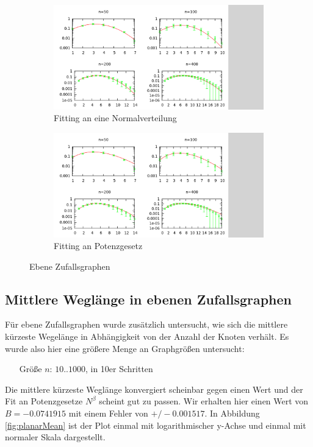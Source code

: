 \documentclass[10pt]{article}
\begin{document}
\begin{figure}[htb!]
\begin{subfigure}{.5\textwidth}
  \centering
  \includegraphics[width=1\linewidth]{../Results/wErrorbars_Normal_Planar.png}
  \caption{Fitting an eine Normalverteilung}
\end{subfigure}%
\begin{subfigure}{.5\textwidth}
  \centering
  \includegraphics[width=1\linewidth]{../Results/wErrorbars_Power_Planar.png}
  \caption{Fitting an Potenzgesetz}
\end{subfigure}
\caption{Ebene Zufallsgraphen}
\label{fig:planar}
\end{figure}

\subsection{Mittlere Weglänge in ebenen Zufallsgraphen}
Für ebene Zufallsgraphen wurde zusätzlich untersucht, wie sich die mittlere kürzeste Wegelänge in Abhängigkeit von der Anzahl der Knoten verhält. Es wurde also hier eine größere Menge an Graphgrößen untersucht:
\begin{itemize}
\item[\quad Größe $n$:] $10..1000$, in 10er Schritten
\end{itemize}
Die mittlere kürzeste Weglänge konvergiert scheinbar gegen einen Wert und der Fit an Potenzgesetze $N^\beta$ scheint gut zu passen. Wir erhalten hier einen Wert von $B= -0.0741915$ mit einem Fehler von $+/- 0.001517$. In Abbildung \ref{fig:planarMean} ist der Plot einmal mit logarithmischer y-Achse und einmal mit normaler Skala dargestellt.
\end{document}
